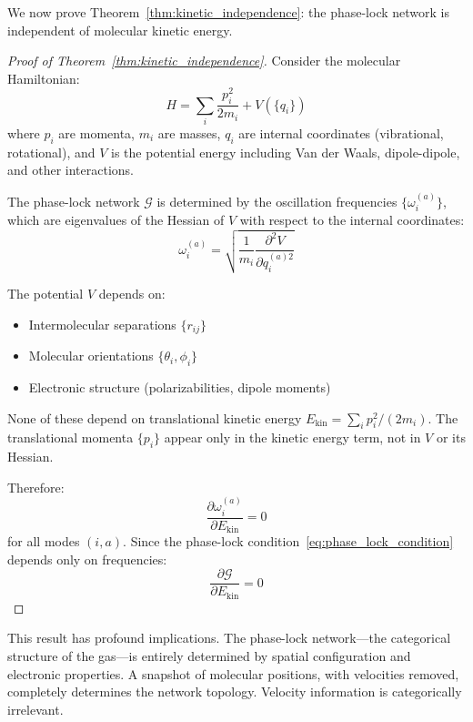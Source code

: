 \documentclass[twocolumn,showpacs,preprintnumbers,amsmath,amssymb,prd]{revtex4-2}
\theoremstyle{definition}
\theoremstyle{remark}
\newcommand{\phaselockgraph}{\mathcal{G}}
\begin{document}
We now prove Theorem~\ref{thm:kinetic_independence}: the phase-lock network is independent of molecular kinetic energy.

\begin{proof}[Proof of Theorem~\ref{thm:kinetic_independence}]
Consider the molecular Hamiltonian:
\begin{equation}
H = \sum_i \frac{p_i^2}{2m_i} + V(\{q_i\})
\label{eq:hamiltonian}
\end{equation}
where $p_i$ are momenta, $m_i$ are masses, $q_i$ are internal coordinates (vibrational, rotational), and $V$ is the potential energy including Van der Waals, dipole-dipole, and other interactions.

The phase-lock network $\phaselockgraph$ is determined by the oscillation frequencies $\{\omega_i^{(a)}\}$, which are eigenvalues of the Hessian of $V$ with respect to the internal coordinates:
\begin{equation}
\omega_i^{(a)} = \sqrt{\frac{1}{m_i}\frac{\partial^2 V}{\partial q_i^{(a)2}}}
\label{eq:frequencies}
\end{equation}

The potential $V$ depends on:
\begin{itemize}
\item Intermolecular separations $\{r_{ij}\}$
\item Molecular orientations $\{\theta_i, \phi_i\}$
\item Electronic structure (polarizabilities, dipole moments)
\end{itemize}

None of these depend on translational kinetic energy $E_{\text{kin}} = \sum_i p_i^2/(2m_i)$. The translational momenta $\{p_i\}$ appear only in the kinetic energy term, not in $V$ or its Hessian.

Therefore:
\begin{equation}
\frac{\partial \omega_i^{(a)}}{\partial E_{\text{kin}}} = 0
\end{equation}
for all modes $(i, a)$. Since the phase-lock condition~\eqref{eq:phase_lock_condition} depends only on frequencies:
\begin{equation}
\frac{\partial \phaselockgraph}{\partial E_{\text{kin}}} = 0
\end{equation}
\end{proof}

This result has profound implications. The phase-lock network---the categorical structure of the gas---is entirely determined by spatial configuration and electronic properties. A snapshot of molecular positions, with velocities removed, completely determines the network topology. Velocity information is categorically irrelevant.
\end{document}
